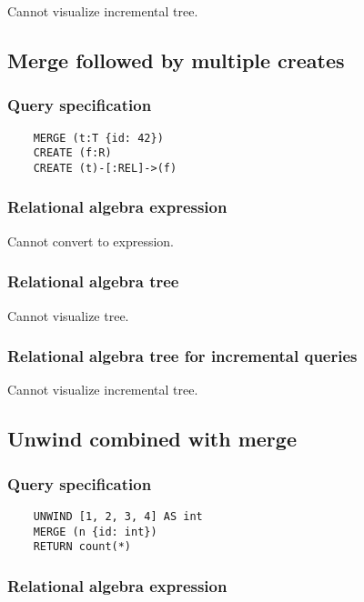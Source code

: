 	Cannot visualize incremental tree.
	\subsection{Merge followed by multiple creates}

	\subsubsection*{Query specification}

	\begin{lstlisting}
	MERGE (t:T {id: 42})
	CREATE (f:R)
	CREATE (t)-[:REL]->(f)
	\end{lstlisting}


	\subsubsection*{Relational algebra expression}

	Cannot convert to expression.

	\subsubsection*{Relational algebra tree}

	Cannot visualize tree.

	\subsubsection*{Relational algebra tree for incremental queries}

	Cannot visualize incremental tree.
	\subsection{Unwind combined with merge}

	\subsubsection*{Query specification}

	\begin{lstlisting}
	UNWIND [1, 2, 3, 4] AS int
	MERGE (n {id: int})
	RETURN count(*)
	\end{lstlisting}


	\subsubsection*{Relational algebra expression}

